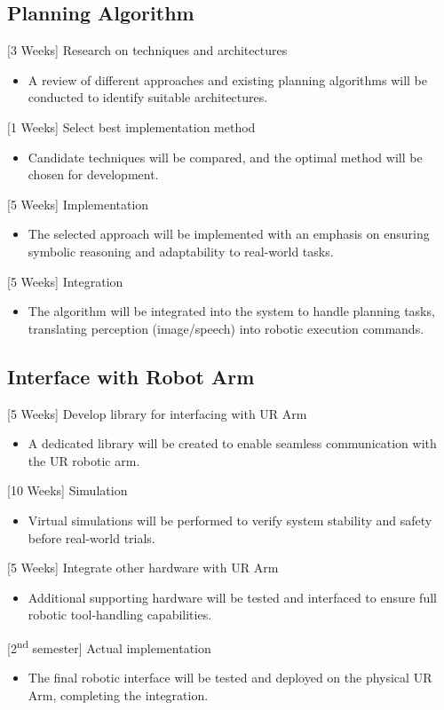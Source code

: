 \documentclass[12pt]{extarticle}
\begin{document}
\subsection{Planning Algorithm}
[3 Weeks] Research on techniques and architectures
\begin{itemize}
    \item A review of different approaches and existing planning algorithms will be conducted to identify suitable architectures.
\end{itemize}
[1 Weeks] Select best implementation method
\begin{itemize}
    \item Candidate techniques will be compared, and the optimal method will be chosen for development.
\end{itemize}
[5 Weeks] Implementation
\begin{itemize}
    \item The selected approach will be implemented with an emphasis on ensuring symbolic reasoning and adaptability to real-world tasks.
\end{itemize}
[5 Weeks] Integration
\begin{itemize}
    \item The algorithm will be integrated into the system to handle planning tasks, translating perception (image/speech) into robotic execution commands.
\end{itemize}
\subsection{Interface with Robot Arm}
[5 Weeks] Develop library for interfacing with UR Arm
\begin{itemize}
    \item A dedicated library will be created to enable seamless communication with the UR robotic arm.
\end{itemize}
[10 Weeks] Simulation
\begin{itemize}
    \item Virtual simulations will be performed to verify system stability and safety before real-world trials.
\end{itemize}
[5 Weeks] Integrate other hardware with UR Arm
\begin{itemize}
    \item Additional supporting hardware will be tested and interfaced to ensure full robotic tool-handling capabilities.
\end{itemize}
[2\textsuperscript{nd} semester] Actual implementation
\begin{itemize}
    \item The final robotic interface will be tested and deployed on the physical UR Arm, completing the integration.
\end{itemize}
\end{document}
